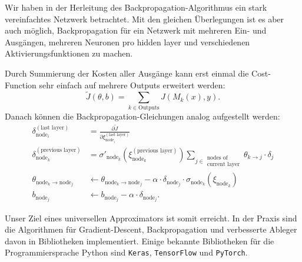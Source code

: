 Wir haben in der Herleitung des Backpropagation-Algorithmus ein stark vereinfachtes
Netzwerk betrachtet. Mit den gleichen Überlegungen ist es aber auch möglich,
Backpropagation für ein Netzwerk mit mehreren Ein- und Ausgängen, mehreren Neuronen pro
hidden layer und verschiedenen Aktivierungsfunktionen zu machen.

Durch Summierung der Kosten aller Ausgänge kann erst einmal die Cost-Function sehr einfach
auf mehrere Outputs erweitert werden:
\begin{equation}
    \tilde J(\theta, b) = \sum_{k\in \text{Outputs}} J(M_k(x), y).
\end{equation}
Danach können die Backpropagation-Gleichungen analog aufgestellt werden:
\begin{equation}
\begin{aligned}
    \delta_{\text{node}_i}^{(\text{last layer})} &=
        \frac{\partial \tilde J}{\partial \xi_{\text{node}_i}^{(\text{last layer})}} \\
    \delta_{\text{node}_k}^{(\text{previous layer})} &=
        \sigma'_{\text{node}_k} \left( \xi_{\text{node}_k}^{(\text{previous layer})} \right) 
        \sum_{j\in \substack{\text{nodes of}\\\text{current layer}}}
        \theta_{k\rightarrow j} \cdot \delta_j\\
    \theta_{\text{node}_k\rightarrow\text{node}_j} &\leftarrow
        \theta_{\text{node}_k\rightarrow\text{node}_j} -
        \alpha \cdot \delta_{\text{node}_j} \cdot \sigma_{\text{node}_k}(\xi_{\text{node}_k}) \\
    b_{\text{node}_j} &\leftarrow b_{\text{node}_j} - \alpha \cdot \delta_{\text{node}_j}.
\end{aligned}
\label{ml:ann:bp:update}
\end{equation}

\bigskip
Unser Ziel eines universellen Approximators ist somit erreicht. In der Praxis sind die
Algorithmen für Gradient-Descent, Backpropagation und verbesserte Ableger davon in
Bibliotheken implementiert. Einige bekannte Bibliotheken für die Programmiersprache Python
sind \texttt{Keras}, \texttt{TensorFlow} und \texttt{PyTorch}.